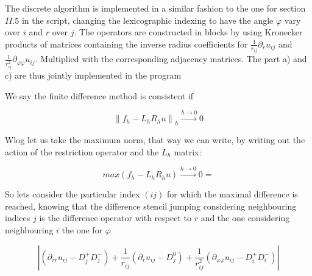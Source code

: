 \newcommand{\assignmentDate}{December 2nd, 2019}
\newcommand{\norm}[1]{\left\lVert#1\right\rVert}



%

%

%

%
%
The discrete algorithm is implemented in a similar fashion to the one for section $II.5$ in the script, changing the lexicographic indexing to have the angle $\varphi$ vary over $i$ and $r$ over $j$. The operators are constructed in blocks by using Kronecker products of matrices containing the inverse radius coefficients for $\frac{1}{r_{ij}}\partial_{r}u_{ij}$ and $\frac{1}{r_{ij}^2}\partial_{\varphi\varphi}u_{ij}$. Multiplied with the corresponding adjacency matrices. The part a) and c) are thus jointly implemented in the program 

%
We say the finite difference method is consistent if

\begin{equation*}
    \norm{f_h-L_h R_h u}_h \xrightarrow{ h \to 0} 0
\end{equation*}

Wlog let us take the maximum norm, that way we can write, by writing out the action of the restriction operator and the $L_h$ matrix:

\begin{equation*}
    max(f_h-L_hR_hu) \xrightarrow{ h \to 0} 0=
\end{equation*}

So lets consider the particular index $(ij)$ for which the maximal difference is reached, knowing that the difference stencil jumping considering neighbouring indices $j$ is the difference operator with respect to $r$ and the one considering neighbouring $i$ the one for $\varphi$

\begin{equation*}
    |(\partial_{rr}u_{ij}-D^{+}_jD^{-}_j)
    +\frac{1}{r_{ij}}(\partial_{r}u_{ij}-D^{0}_j)
    +\frac{1}{r_{ij}^2}(\partial_{\varphi\varphi}u_{ij}-D^{+}_iD^{-}_i)|
\end{equation*}

